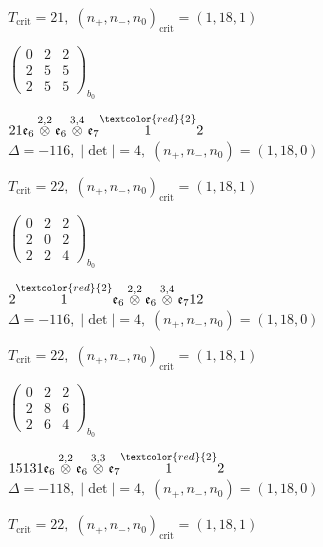 \documentclass[10pt]{article}
\begin{document}
\hspace{1em}$T_{\text{crit}}=21,\; (n_+,n_-,n_0)_{\text{crit}}=(1,18,1)$

\hspace{2em}$\left(\begin{smallmatrix}0 & 2 & 2 \\ 2 & 5 & 5 \\ 2 & 5 & 5\end{smallmatrix}\right)_{\!b_0}$

\smallskip

$21\mathfrak{e}_6\overset{2,2}{\otimes}\mathfrak{e}_6\overset{3,4}{\otimes}\mathfrak{e}_7\overset{\textcolor{red}{2}}{1}2$ \quad $\Delta=-116,\; |\det|=4,\; (n_+,n_-,n_0)=(1,18,0)$

\hspace{1em}$T_{\text{crit}}=22,\; (n_+,n_-,n_0)_{\text{crit}}=(1,18,1)$

\hspace{2em}$\left(\begin{smallmatrix}0 & 2 & 2 \\ 2 & 0 & 2 \\ 2 & 2 & 4\end{smallmatrix}\right)_{\!b_0}$

$2\overset{\textcolor{red}{2}}{1}\mathfrak{e}_6\overset{2,2}{\otimes}\mathfrak{e}_6\overset{3,4}{\otimes}\mathfrak{e}_712$ \quad $\Delta=-116,\; |\det|=4,\; (n_+,n_-,n_0)=(1,18,0)$

\hspace{1em}$T_{\text{crit}}=22,\; (n_+,n_-,n_0)_{\text{crit}}=(1,18,1)$

\hspace{2em}$\left(\begin{smallmatrix}0 & 2 & 2 \\ 2 & 8 & 6 \\ 2 & 6 & 4\end{smallmatrix}\right)_{\!b_0}$

\smallskip

$15131\mathfrak{e}_6\overset{2,2}{\otimes}\mathfrak{e}_6\overset{3,3}{\otimes}\mathfrak{e}_7\overset{\textcolor{red}{2}}{1}2$ \quad $\Delta=-118,\; |\det|=4,\; (n_+,n_-,n_0)=(1,18,0)$

\hspace{1em}$T_{\text{crit}}=22,\; (n_+,n_-,n_0)_{\text{crit}}=(1,18,1)$
\end{document}

